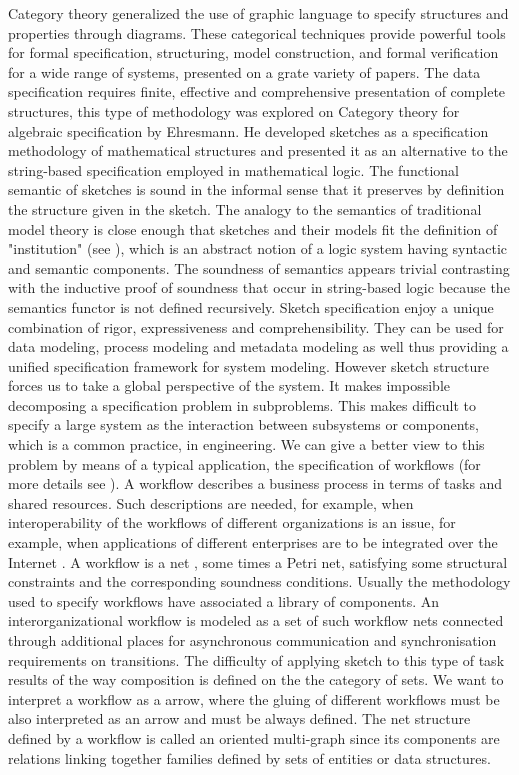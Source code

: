 \documentclass[oribibl]{llncs}
\begin{document}
Category theory generalized the use of graphic language to specify
structures and properties through diagrams. These categorical
techniques provide powerful tools for formal specification,
structuring, model construction, and formal verification for a wide
range of systems, presented on a grate variety of papers. The data
specification requires finite, effective and comprehensive
presentation of complete structures, this type of methodology was
explored on Category theory for algebraic specification by
Ehresmann. He developed sketches as a specification methodology of
mathematical structures and presented it as an alternative to the
string-based specification employed in mathematical logic. The
functional semantic of sketches is sound in the informal sense that
it preserves by definition the structure given in the sketch. The
analogy to the semantics of traditional model theory is close enough
that sketches and their models fit the definition of "institution"
(see \cite{goguen83}), which is an abstract notion of a logic system
having syntactic and semantic components. The soundness of semantics
appears trivial contrasting with the inductive proof of soundness
that occur in string-based logic because the semantics functor is
not defined recursively. Sketch specification enjoy a unique
combination of rigor, expressiveness and comprehensibility. They can
be used for data modeling, process modeling and metadata modeling as
well thus providing a unified specification framework for system
modeling. However sketch structure forces us to take a global
perspective of the system. It makes impossible decomposing a
specification problem in subproblems. This makes difficult to
specify a large system as the interaction between subsystems or
components, which is a common practice, in engineering. We can give
a better view to this problem by means of a typical application, the
specification of workflows (for more details see
\cite{Baldanall05}). A workflow describes a business process in
terms of tasks and shared resources. Such descriptions are needed,
for example, when interoperability of the workflows of different
organizations is an issue, for example, when applications of
different enterprises are to be integrated over the Internet
\cite{Baldanall05}. A workflow is a net \cite{Aalst98}, some times a
Petri net, satisfying some structural constraints and the
corresponding soundness conditions. Usually the methodology used to
specify workflows have associated a library of components. An
interorganizational workflow is modeled as a set of such workflow
nets \cite{Aalst99} connected through additional places for
asynchronous communication and synchronisation requirements on
transitions. The difficulty of applying sketch to this type of task
results of the way composition is defined on the the category of
sets. We want to interpret a workflow as a arrow, where the gluing
of different workflows must be also interpreted as an arrow and must
be always defined. The net structure defined by a workflow is called
an oriented multi-graph since its components are relations linking
together families defined by sets of entities or data structures.
\end{document}
